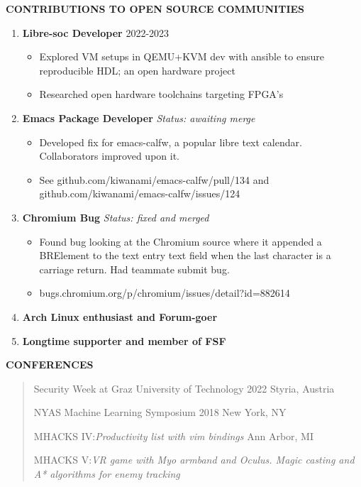 \documentclass[11pt,a4paper]{article}
\begin{document}
\textbf{CONTRIBUTIONS TO OPEN SOURCE COMMUNITIES}

\begin{enumerate}
\item \textbf{Libre-soc Developer} 2022-2023
\begin{itemize}
\item Explored VM setups in QEMU+KVM dev with ansible to ensure reproducible HDL; an open hardware project
\item Researched open hardware toolchains targeting FPGA's
\end{itemize}

\item \textbf{Emacs Package Developer} \emph{Status: awaiting merge}
\begin{itemize}
\item Developed fix for emacs-calfw, a popular libre text calendar.
Collaborators improved upon it.
\item See github.com/kiwanami/emacs-calfw/pull/134 and
github.com/kiwanami/emacs-calfw/issues/124
\end{itemize}

\item \textbf{Chromium Bug} \emph{Status: fixed and merged}
\begin{itemize}
\item Found bug looking at the Chromium source where it appended a BRElement
to the text entry text field when the last character is a carriage
return. Had teammate submit bug.
\item bugs.chromium.org/p/chromium/issues/detail?id=882614
\end{itemize}

\item \textbf{Arch Linux enthusiast and Forum-goer}

\item \textbf{Longtime supporter and member of FSF}
\end{enumerate}

\textbf{CONFERENCES}
\begin{quote}
Security Week at Graz University of Technology 2022 Styria, Austria

NYAS Machine Learning Symposium 2018 New York, NY

MHACKS IV:\emph{Productivity list with vim bindings} Ann Arbor, MI

MHACKS V:\emph{VR game with Myo armband and Oculus. Magic casting and A*
algorithms for enemy tracking}
\end{quote}
\end{document}
